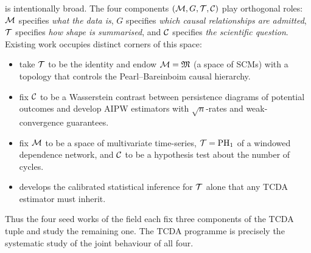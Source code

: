  is intentionally broad. The four components
$(\mathcal{M}, G, \mathcal{T}, \mathcal{C})$ play orthogonal roles: $\mathcal{M}$ specifies \emph{what
the data is}, $G$ specifies \emph{which causal relationships are
admitted}, $\mathcal{T}$ specifies \emph{how shape is summarised}, and $\mathcal{C}$
specifies \emph{the scientific question}. Existing work occupies
distinct corners of this space:
\begin{itemize}[leftmargin=2em]
\item \citet{ibeling2021topological} take $\mathcal{T}$ to be the identity and
endow $\mathcal{M} = \mathfrak{M}$ (a space of SCMs) with a topology that controls
the Pearl--Bareinboim causal hierarchy.
\item \citet{kim2026topological} fix $\mathcal{C}$ to be a Wasserstein contrast
between persistence diagrams of potential outcomes and develop AIPW
estimators with $\sqrt n$-rates and weak-convergence guarantees.
\item \citet{elyaagoubi2023statistical} fix $\mathcal{M}$ to be a space of
multivariate time-series, $\mathcal{T} = \mathrm{PH}_{1}$ of a windowed dependence
network, and $\mathcal{C}$ to be a hypothesis test about the number of cycles.
\item \citet{lecci2014statistical} develops the calibrated statistical
inference for $\mathcal{T}$ alone that any TCDA estimator must inherit.
\end{itemize}
Thus the four seed works of the field each fix three components of the
TCDA tuple and study the remaining one. The TCDA programme is precisely
the systematic study of the joint behaviour of all four.




